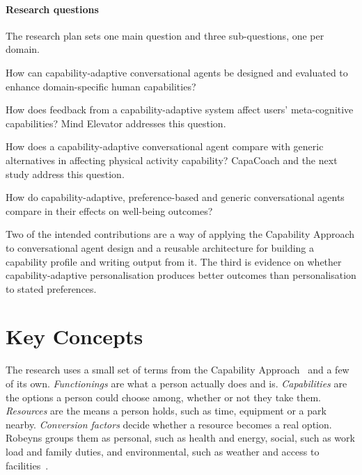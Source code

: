 \documentclass[manuscript,screen,review]{acmart}
\begin{document}
\paragraph{Research questions} The research plan sets one main question and three sub-questions, one per domain.

\begin{description}
\setlength{\itemsep}{0pt}
\item[Main RQ] How can capability-adaptive conversational agents be designed and evaluated to enhance domain-specific human capabilities?
\item[RQ1 (Cognitive)] How does feedback from a capability-adaptive system affect users' meta-cognitive capabilities? Mind Elevator addresses this question.
\item[RQ2 (Behavioural)] How does a capability-adaptive conversational agent compare with generic alternatives in affecting physical activity capability? CapaCoach and the next study address this question.
\item[RQ3 (Affective)] How do capability-adaptive, preference-based and generic conversational agents compare in their effects on well-being outcomes?
\end{description}

Two of the intended contributions are a way of applying the Capability Approach to conversational agent design and a reusable architecture for building a capability profile and writing output from it. The third is evidence on whether capability-adaptive personalisation produces better outcomes than personalisation to stated preferences.

\section{Key Concepts}

The research uses a small set of terms from the Capability Approach~\cite{sen1999development,robeyns2005capability} and a few of its own. \textit{Functionings} are what a person actually does and is. \textit{Capabilities} are the options a person could choose among, whether or not they take them. \textit{Resources} are the means a person holds, such as time, equipment or a park nearby. \textit{Conversion factors} decide whether a resource becomes a real option. Robeyns groups them as personal, such as health and energy, social, such as work load and family duties, and environmental, such as weather and access to facilities~\cite{robeyns2005capability}.
\end{document}
